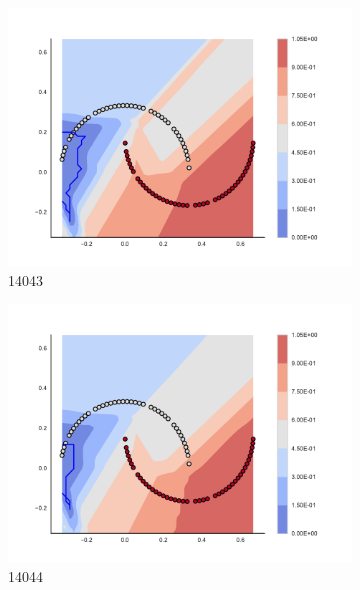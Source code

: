 \begin{figure}[h]
\begin{subfigure}[b]{0.09\textwidth}
    \includegraphics[clip, trim=2.35cm 1.75cm 4.5cm 0cm,width=\textwidth]{img/convergence/14043.pdf}
    \caption{14043}
    \label{fig:convergence_14043}
\end{subfigure}
%
\begin{subfigure}[b]{0.09\textwidth}
    \includegraphics[clip, trim=2.35cm 1.75cm 4.5cm 0cm,width=\textwidth]{img/convergence/14044.pdf}
    \caption{14044}
    \label{fig:convergence_14044}
\end{subfigure}
%
\begin{subfigure}[b]{0.09\textwidth}

\end{subfigure}
\end{figure}
